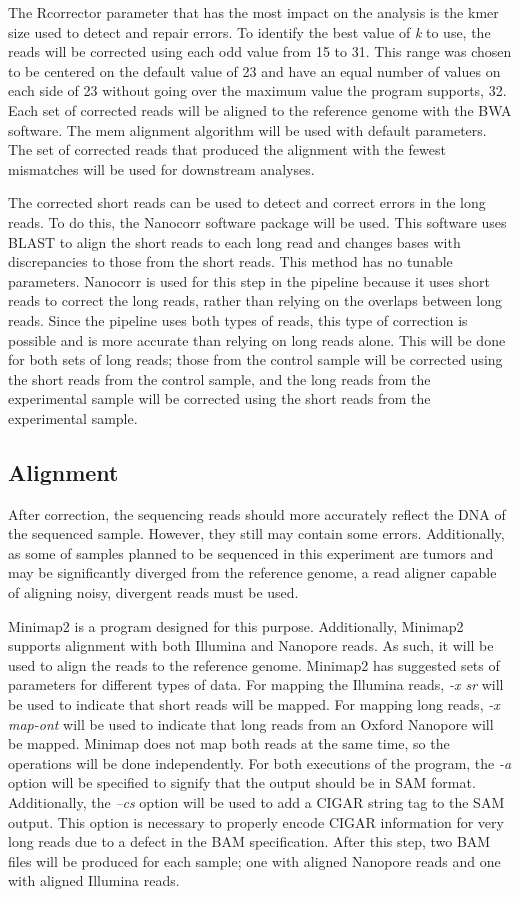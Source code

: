 The Rcorrector parameter that has the most impact on the analysis is the kmer size used to detect and repair errors. To identify the best value of \textit{k} to use, the reads will be corrected using each odd value from 15 to 31. This range was chosen to be centered on the default value of 23 and have an equal number of values on each side of 23 without going over the maximum value the program supports, 32. Each set of corrected reads will be aligned to the reference genome with the BWA software. The mem alignment algorithm will be used with default parameters. The set of corrected reads that produced the alignment with the fewest mismatches will be used for downstream analyses.

The corrected short reads can be used to detect and correct errors in the long reads. To do this, the Nanocorr software package will be used. This software uses BLAST to align the short reads to each long read and changes bases with discrepancies to those from the short reads. This method has no tunable parameters. Nanocorr is used for this step in the pipeline because it uses short reads to correct the long reads, rather than relying on the overlaps between long reads. Since the pipeline uses both types of reads, this type of correction is possible and is more accurate than relying on long reads alone. This will be done for both sets of long reads; those from the control sample will be corrected using the short reads from the control sample, and the long reads from the experimental sample will be corrected using the short reads from the experimental sample.

\subsection{Alignment}

After correction, the sequencing reads should more accurately reflect the DNA of the sequenced sample. However, they still may contain some errors. Additionally, as some of samples planned to be sequenced in this experiment are tumors and may be significantly diverged from the reference genome, a read aligner capable of aligning noisy, divergent reads must be used.

Minimap2 is a program designed for this purpose. Additionally, Minimap2 supports alignment with both Illumina and Nanopore reads. As such, it will be used to align the reads to the reference genome.
Minimap2 has suggested sets of parameters for different types of data. For mapping the Illumina reads, \textit{-x sr} will be used to indicate that short reads will be mapped. For mapping long reads, \textit{-x map-ont} will be used to indicate that long reads from an Oxford Nanopore will be mapped. Minimap does not map both reads at the same time, so the operations will be done independently. For both executions of the program, the \textit{-a} option will be specified to signify that the output should be in SAM format. Additionally, the \textit{--cs} option will be used to add a CIGAR string tag to the SAM output. This option is necessary to properly encode CIGAR information for very long reads due to a defect in the BAM specification. After this step, two BAM files will be produced for each sample; one with aligned Nanopore reads and one with aligned Illumina reads.

